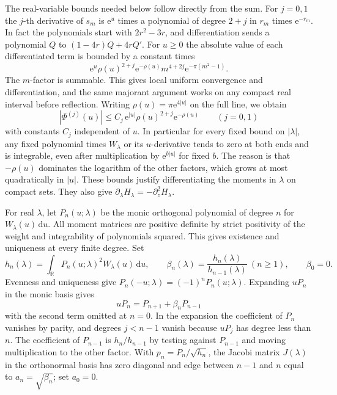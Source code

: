 \documentclass[11pt]{article}
\numberwithin{equation}{section}
\newcommand{\e}{\mathrm e}
\newcommand{\dd}{\mathrm d}
\newcommand{\R}{\mathbb R}
\begin{document}
The real-variable bounds needed below follow directly from the sum.
For \(j=0,1\) the \(j\)-th derivative of \(s_m\) is \(\e^u\)
times a polynomial of degree \(2+j\) in \(r_m\) times \(\e^{-r_m}\).
In fact the polynomials start with \(2r^2-3r\), and differentiation
sends a polynomial \(Q\) to \((1-4r)Q+4rQ'\). For \(u\ge0\) the
absolute value of each differentiated term is bounded by a constant
times
\[
 \e^u\rho(u)^{2+j}\e^{-\rho(u)}
     m^{4+2j}\e^{-\pi(m^2-1)}.
\]
The \(m\)-factor is summable. This gives local uniform convergence
and differentiation, and the same majorant argument works on any
compact real interval before reflection. Writing
\(\rho(u)=\pi\e^{4|u|}\) on the full line, we obtain
\begin{equation}
 |\Phi^{(j)}(u)|\le C_j\,\e^{|u|}\rho(u)^{2+j}\e^{-\rho(u)}
       \qquad (j=0,1)
 \label{eq:tail}
\end{equation}
with constants \(C_j\) independent of \(u\). In particular for every
fixed bound on \(|\lambda|\), any fixed polynomial times \(W_\lambda\)
or its \(u\)-derivative tends to zero at both ends and is integrable,
even after multiplication by \(\e^{b|u|}\) for fixed \(b\).
The reason is that \(-\rho(u)\) dominates the logarithm of the other
factors, which grows at most quadratically in \(|u|\).
These bounds justify differentiating the moments in \(\lambda\) on
compact sets. They also give
\(\partial_\lambda H_\lambda=-\partial_z^2H_\lambda\).

For real \(\lambda\), let \(P_n(u;\lambda)\) be the monic
orthogonal polynomial of degree \(n\) for \(W_\lambda(u)\,\dd u\).
All moment matrices are positive definite by strict positivity
of the weight and integrability of polynomials squared. This
gives existence and uniqueness at every finite degree. Set
\[
 h_n(\lambda)=\int_\R P_n(u;\lambda)^2W_\lambda(u)\,\dd u,\qquad
 \beta_n(\lambda)=\frac{h_n(\lambda)}{h_{n-1}(\lambda)}\ (n\ge1),
 \qquad \beta_0=0 .
\]
Evenness and uniqueness give \(P_n(-u;\lambda)=(-1)^nP_n(u;\lambda)\).
Expanding \(uP_n\) in the monic basis gives
\begin{equation}
 uP_n=P_{n+1}+\beta_nP_{n-1}
 \label{eq:recurrence}
\end{equation}
with the second term omitted at \(n=0\). In the expansion the coefficient
of \(P_n\) vanishes by parity, and degrees \(j<n-1\) vanish because
\(uP_j\) has degree less than \(n\). The coefficient of \(P_{n-1}\)
is \(h_n/h_{n-1}\) by testing against \(P_{n-1}\) and moving
multiplication to the other factor. With \(p_n=P_n/\sqrt{h_n}\),
the Jacobi matrix \(J(\lambda)\) in the orthonormal basis has
zero diagonal and edge between \(n-1\) and \(n\) equal to
\(a_n=\sqrt{\beta_n}\); set \(a_0=0\).
\end{document}
